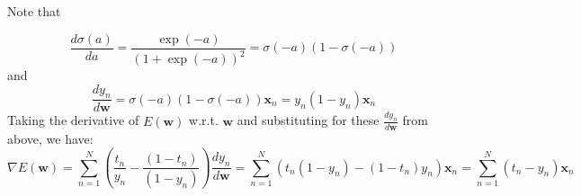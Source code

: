 \documentclass{article}
\begin{document}
Note that

\begin{equation*}
\frac{d \sigma(a)}{d a} = \frac{\exp(-a)}{(1+ \exp(-a))^2} = \sigma(-a) (1-\sigma(-a))
\end{equation*}
and
\begin{equation*}
\frac{d y_n}{d \mathbf{w}} = \sigma(-a) (1-\sigma(-a)) \mathbf{x}_n = y_n (1-y_n) \mathbf{x}_n
\end{equation*}
Taking the derivative of $E(\mathbf{w})$ w.r.t. $\mathbf{w}$ and substituting for these $\frac{d y_n}{d \mathbf{w}}$ from above, we have:
\begin{equation*}
\nabla E(\mathbf{w}) = \sum_{n=1}^N (\frac{t_n}{y_n}  - \frac{(1-t_n)}{(1-y_n)}) \frac{d y_n}{d \mathbf{w}} = \sum_{n=1}^N (t_n(1-y_n)-(1-t_n)y_n) \mathbf{x}_n = \sum_{n=1}^N(t_n - y_n)\mathbf{x}_n
\end{equation*} 
\end{document}
